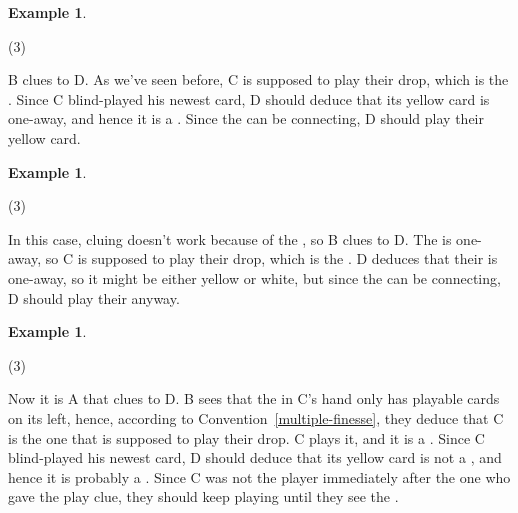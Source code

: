 \documentclass[a4paper]{article}
\theoremstyle{plain}
\theoremstyle{definition}
\newtheorem{example}[theorem]{Example}
\begin{document}
\begin{example}
	\hfill
	\begin{tasks}(3)
		\task[+]      
		\task[A]    
		\task[B]    
		\task[C]    
		\task[D]    
		\task[E]    
	\end{tasks}
	
	B clues  to D. As we've seen before, C is supposed to play their drop, which is the . Since C blind-played his newest card, D should deduce that its yellow card is one-away, and hence it is a . Since the  can be connecting, D should play their yellow card.
\end{example}

\begin{example}
	\hfill
	\begin{tasks}(3)
		\task[+]      
		\task[A]    
		\task[B]    
		\task[C]    
		\task[D]    
		\task[E]    
	\end{tasks}
	
	In this case, cluing  doesn't work because of the , so B clues  to D. The  is one-away, so C is supposed to play their drop, which is the . D deduces that their  is one-away, so it might be either yellow or white, but since the  can be connecting, D should play their  anyway.
\end{example}

\begin{example}
	\hfill
	\begin{tasks}(3)
		\task[+]      
		\task[A]    
		\task[B]    
		\task[C]    
		\task[D]    
		\task[E]    
	\end{tasks}
	
	Now it is A that clues  to D. B sees that the  in C's hand only has playable cards on its left, hence, according to Convention~\ref{multiple-finesse}, they deduce that C is the one that is supposed to play their drop. C plays it, and it is a . Since C blind-played his newest card, D should deduce that its yellow card is not a , and hence it is probably a . Since C was not the player immediately after the one who gave the play clue, they should keep playing until they see the .
\end{example}
\end{document}
